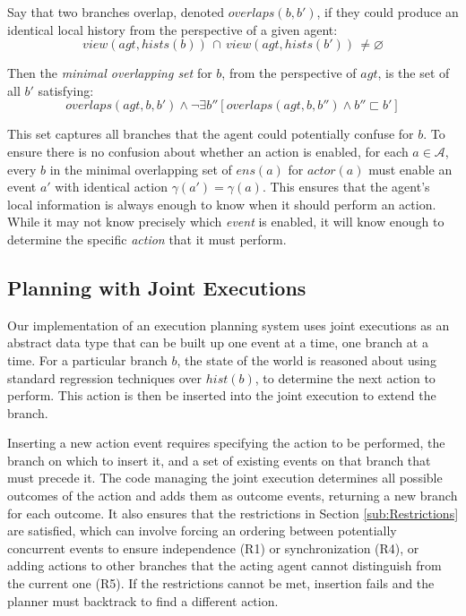 Say that two branches overlap, denoted $overlaps(b,b')$, if they
could produce an identical local history from the perspective of a
given agent:\[
view(agt,hists(b))\,\cap\, view(agt,hists(b'))\,\neq\varnothing\]


Then the \emph{minimal overlapping set} for $b$, from the perspective
of $agt$, is the set of all $b'$ satisfying:\[
overlaps(agt,b,b')\wedge\neg\exists b''\left[overlaps(agt,b,b'')\wedge b''\sqsubset b'\right]\]


This set captures all branches that the agent could potentially confuse
for $b$. To ensure there is no confusion about whether an action
is enabled, for each $a\in\mathcal{A}$, every $b$ in the minimal
overlapping set of $ens(a)$ for $actor(a)$ must enable an event
$a'$ with identical action $\gamma(a')=\gamma(a)$. This ensures
that the agent's local information is always enough to know when it
should perform an action. While it may not know precisely which \emph{event}
is enabled, it will know enough to determine the specific \emph{action}
that it must perform.


\subsection{Planning with Joint Executions}

Our implementation of an execution planning system uses joint executions
as an abstract data type that can be built up one event at a time,
one branch at a time. For a particular branch $b$, the state of the
world is reasoned about using standard regression techniques over
$hist(b)$, to determine the next action to perform. This action is
then be inserted into the joint execution to extend the branch.

Inserting a new action event requires specifying the action to be
performed, the branch on which to insert it, and a set of existing
events on that branch that must precede it. The code managing the
joint execution determines all possible outcomes of the action and
adds them as outcome events, returning a new branch for each outcome.
It also ensures that the restrictions in Section \ref{sub:Restrictions}
are satisfied, which can involve forcing an ordering between potentially
concurrent events to ensure independence (R1) or synchronization (R4),
or adding actions to other branches that the acting agent cannot distinguish
from the current one (R5). If the restrictions cannot be met, insertion
fails and the planner must backtrack to find a different action.

